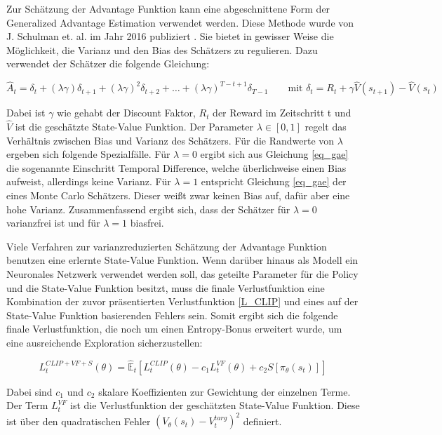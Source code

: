 Zur Schätzung der Advantage Funktion kann eine abgeschnittene Form der Generalized Advantage Estimation verwendet werden. Diese Methode wurde von J. Schulman et. al. im Jahr 2016 publiziert \cite{GAE}. Sie bietet in gewisser Weise die Möglichkeit, die Varianz und den Bias des Schätzers zu regulieren. Dazu verwendet der Schätzer die folgende Gleichung:

\begin{equation}
  \hat{A}_t = \delta_t + (\lambda \gamma) \delta_{t+1} + (\lambda \gamma)^2 \delta_{t+2} + \dots + (\lambda \gamma)^{T-t+1} \delta_{T-1} \qquad \text{mit } \delta_t = R_t + \gamma \hat{V}(s_{t+1}) - \hat{V}(s_t)
  \label{eq_gae}
\end{equation}

Dabei ist $\gamma$ wie gehabt der Discount Faktor, $R_t$ der Reward im Zeitschritt t und $\hat{V}$ ist die geschätzte State-Value Funktion. Der Parameter $\lambda \in [0, 1]$ regelt das Verhältnis zwischen Bias und Varianz des Schätzers. Für die Randwerte von $\lambda$ ergeben sich folgende Spezialfälle. Für $\lambda = 0$ ergibt sich aus Gleichung \ref{eq_gae} die sogenannte Einschritt Temporal Difference, welche überlichweise einen Bias aufweist, allerdings keine Varianz. Für $\lambda = 1$ entspricht Gleichung \ref{eq_gae} der eines Monte Carlo Schätzers. Dieser weißt zwar keinen Bias auf, dafür aber eine hohe Varianz. Zusammenfassend ergibt sich, dass der Schätzer für $\lambda = 0$ varianzfrei ist und für $\lambda = 1$ biasfrei.

Viele Verfahren zur varianzreduzierten Schätzung der Advantage Funktion benutzen eine erlernte State-Value Funktion. Wenn darüber hinaus als Modell ein Neuronales Netzwerk verwendet werden soll, das geteilte Parameter für die Policy und die State-Value Funktion besitzt, muss die finale Verlustfunktion eine Kombination der zuvor präsentierten Verlustfunktion \eqref{L_CLIP} und eines auf der State-Value Funktion basierenden Fehlers sein. Somit ergibt sich die folgende finale Verlustfunktion, die noch um einen Entropy-Bonus erweitert wurde, um eine ausreichende Exploration sicherzustellen:

\begin{equation}
	L_t^{CLIP+VF+S}(\theta) = \hat{\mathbb{E}}_t[L_t^{CLIP}(\theta) - c_1 L_t^{VF}(\theta) + c_2 S[\pi_\theta(s_t)]]
  \label{L_gesamt}
\end{equation}

Dabei sind $c_1$ und $c_2$ skalare Koeffizienten zur Gewichtung der einzelnen Terme. Der Term $L_t^{VF}$ ist die Verlustfunktion der geschätzten State-Value Funktion. Diese ist über den quadratischen Fehler $(V_\theta(s_t) - V_t^{targ})^2$ definiert.

